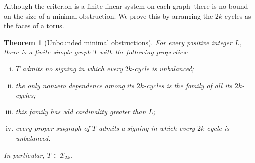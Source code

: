 \documentclass{article}
\newtheorem{theorem}{Theorem}[section]
\theoremstyle{definition}
\theoremstyle{remark}
\begin{document}
Although the criterion is a finite linear system on each graph, there is
no bound on the size of a minimal obstruction.  We prove this by arranging
the $2k$-cycles as the faces of a torus.

\begin{theorem}[Unbounded minimal obstructions]\label{thm:unbounded-minimal-obstructions}
For every positive integer $L$, there is a finite simple graph $T$ with
the following properties:
\begin{enumerate}[(i)]
\item $T$ admits no signing in which every $2k$-cycle is unbalanced;
\item the only nonzero dependence among its $2k$-cycles is the family of
all its $2k$-cycles;
\item this family has odd cardinality greater than $L$;
\item every proper subgraph of $T$ admits a signing in which every
$2k$-cycle is unbalanced.
\end{enumerate}
In particular, $T\in\mathcal B_{2k}$.
\end{theorem}
\end{document}
